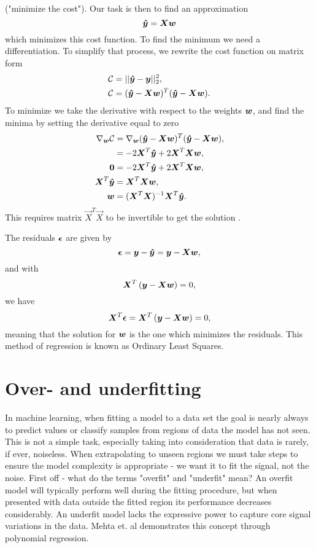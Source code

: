 ("minimize the cost"). Our task is then to find an approximation
\begin{equation}\label{eq:ols-approximation}
	{\boldsymbol{\hat{y}}} = {\boldsymbol{Xw}}
\end{equation}
which minimizes this cost function.
To find the minimum we need a differentiation. To simplify that process, we rewrite the cost function on matrix form
\begin{align*}
\mathcal{C} &= || {\boldsymbol{\hat{y}}} - {\boldsymbol{y}} ||_2 ^2, \\
\mathcal{C} &= ( {\boldsymbol{\hat{y}}} - {\boldsymbol{Xw}})^T( {\boldsymbol{\hat{y}}} - {\boldsymbol{Xw}}).
\end{align*}
To minimize we take the derivative with respect to the weights ${\boldsymbol{w}}$,
and find the minima by setting the derivative equal to zero
\begin{align}
\nabla _{{\boldsymbol{w}}}\mathcal{C} &= \nabla _{{\boldsymbol{w}}} ( {\boldsymbol{\hat{y}}} - {\boldsymbol{Xw}})^T( {\boldsymbol{\hat{y}}} - {\boldsymbol{Xw}}), \\
&= -2{\boldsymbol{X}}^T{\boldsymbol{\hat{y}}} + 2{\boldsymbol{X}}^T{\boldsymbol{X}}{\boldsymbol{w}}, \\
{\boldsymbol{0}} &= -2{\boldsymbol{X}}^T{\boldsymbol{\hat{y}}} + 2{\boldsymbol{X}}^T{\boldsymbol{X}}{\boldsymbol{w}}, \\
{\boldsymbol{X}}^T{\boldsymbol{\hat{y}}} &= {\boldsymbol{X}}^T{\boldsymbol{X}}{\boldsymbol{w}}, \\
{\boldsymbol{w}} &=({\boldsymbol{X}}^T{\boldsymbol{X}})^{-1} {\boldsymbol{X}}^T{\boldsymbol{\hat{y}}}. \label{eq:ols}
\end{align}
This requires matrix \(\vec{X}^T\vec{X}\) to be invertible to get the solution 
\cite{James2000}.

The residuals ${\boldsymbol{\epsilon}}$ are given by
$${\boldsymbol{\epsilon}} = {\boldsymbol{y}}-{\boldsymbol{\hat{y}}} = {\boldsymbol{y}}-{\boldsymbol{X}}{\boldsymbol{w}},$$
and with 
$${\boldsymbol{X}}^T\left( {\boldsymbol{y}}-{\boldsymbol{X}}{\boldsymbol{w}}\right)= 0,$$
we have
$${\boldsymbol{X}}^T{\boldsymbol{\epsilon}}={\boldsymbol{X}}^T\left( {\boldsymbol{y}}-{\boldsymbol{X}}{\boldsymbol{w}}\right)= 0,$$
meaning that the solution for ${\boldsymbol{w}}$ is the one which minimizes the residuals.
This method of regression is known as Ordinary Least Squares.

\section{Over- and underfitting}\label{sec:overfitting}
In machine learning, when fitting a model to a data set the goal is nearly always to predict 
values or classify samples from regions of data the model has not seen. This is not a simple task,
especially taking into consideration that data is rarely, if ever, noiseless. When extrapolating to 
unseen regions we must take steps to ensure the model complexity is appropriate - we want it to fit 
the signal, not the noise. First off - what do the terms "overfit" and "underfit" mean?
An overfit model will typically perform well during the fitting procedure, but when presented with
data outside the fitted region its performance decreases considerably.
An underfit model lacks the expressive power to capture core signal variations in the data.
Mehta et. al \cite{Mehta2019} demonstrates this concept through polynomial regression.

